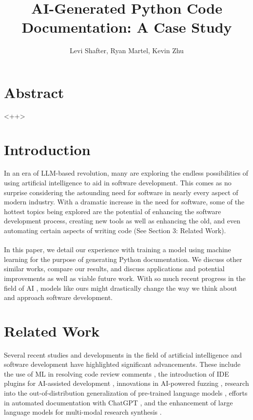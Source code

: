 \documentclass[12pt]{article}
\begin{document}
	\title{ AI-Generated Python Code Documentation: A Case Study }
	\author{Levi Shafter, Ryan Martel, Kevin Zhu}
	\maketitle

	\section*{Abstract}
	<++>

	\section{Introduction}
	\paragraph{} In an era of LLM-based revolution, many are exploring the endless possibilities of using artificial intelligence to aid in software development. This comes as no surprise considering the astounding need for software in nearly every aspect of modern industry. \cite{emerald2019csrImpact} With a dramatic increase in the need for software, some of the hottest topics being explored are the potential of enhancing the software development process, creating new tools as well as enhancing the old, and even automating certain aspects of writing code (See Section 3: Related Work). 
	\paragraph{} In this paper, we detail our experience with training a model using machine learning for the purpose of generating Python documentation. We discuss other similar works, compare our results, and discuss applications and potential improvements as well as viable future work. With so much recent progress in the field of AI \cite{shietal2020IoT_AI}, models like ours might drastically change the way we think about and approach software development.

	\section{Related Work}
	\paragraph{} Several recent studies and developments in the field of artificial intelligence and software development have highlighted significant advancements. These include the use of ML in resolving code review comments \cite{google2023codeReviewML}, the introduction of IDE plugins for AI-assisted development \cite{qodoAI2024idePlugin}, innovations in AI-powered fuzzing \cite{google2023aiFuzzing, cso2024aiFuzzing}, research into the out-of-distribution generalization of pre-trained language models \cite{chen2023oodGeneralization}, efforts in automated documentation with ChatGPT \cite{awekrx2024autodoc}, and the enhancement of large language models for multi-modal research synthesis \cite{wiggers2023largeModels}.
\end{document}
